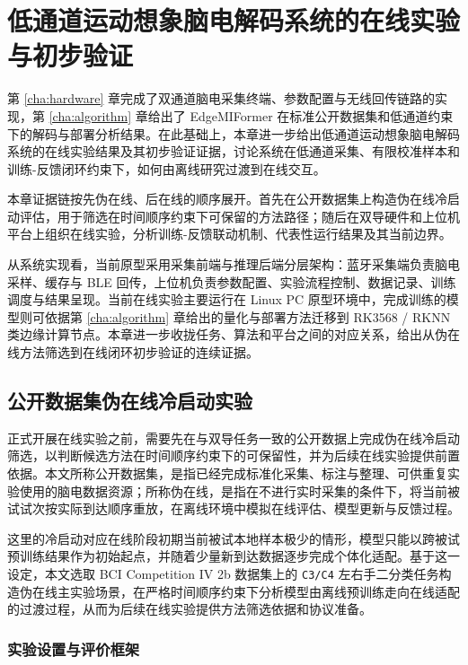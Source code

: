\chapter{低通道运动想象脑电解码系统的在线实验与初步验证}
\label{cha:verification}

第 \ref{cha:hardware} 章完成了双通道脑电采集终端、参数配置与无线回传链路的实现，第 \ref{cha:algorithm} 章给出了 EdgeMIFormer 在标准公开数据集和低通道约束下的解码与部署分析结果。在此基础上，本章进一步给出低通道运动想象脑电解码系统的在线实验结果及其初步验证证据，讨论系统在低通道采集、有限校准样本和训练-反馈闭环约束下，如何由离线研究过渡到在线交互。

本章证据链按先伪在线、后在线的顺序展开。首先在公开数据集上构造伪在线冷启动评估，用于筛选在时间顺序约束下可保留的方法路径；随后在双导硬件和上位机平台上组织在线实验，分析训练-反馈联动机制、代表性运行结果及其当前边界。

从系统实现看，当前原型采用采集前端与推理后端分层架构：蓝牙采集端负责脑电采样、缓存与 BLE 回传，上位机负责参数配置、实验流程控制、数据记录、训练调度与结果呈现。当前在线实验主要运行在 Linux PC 原型环境中，完成训练的模型则可依据第 \ref{cha:algorithm} 章给出的量化与部署方法迁移到 RK3568 / RKNN 类边缘计算节点。本章进一步收拢任务、算法和平台之间的对应关系，给出从伪在线方法筛选到在线闭环初步验证的连续证据。

\section{公开数据集伪在线冷启动实验}

正式开展在线实验之前，需要先在与双导任务一致的公开数据上完成伪在线冷启动筛选，以判断候选方法在时间顺序约束下的可保留性，并为后续在线实验提供前置依据。本文所称公开数据集，是指已经完成标准化采集、标注与整理、可供重复实验使用的脑电数据资源；所称伪在线，是指在不进行实时采集的条件下，将当前被试试次按实际到达顺序重放，在离线环境中模拟在线评估、模型更新与反馈过程。

这里的冷启动对应在线阶段初期当前被试本地样本极少的情形，模型只能以跨被试预训练结果作为初始起点，并随着少量新到达数据逐步完成个体化适配。基于这一设定，本文选取 BCI Competition IV 2b 数据集上的 \texttt{C3/C4} 左右手二分类任务构造伪在线主实验场景，在严格时间顺序约束下分析模型由离线预训练走向在线适配的过渡过程，从而为后续在线实验提供方法筛选依据和协议准备。

\subsection{实验设置与评价框架}

